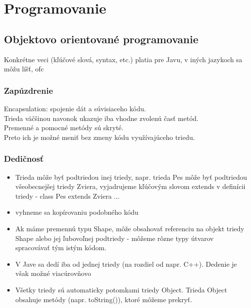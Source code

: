 \chapter[Programovanie]{Programovanie}
\label{programovanie} %


\section{Objektovo orientované programovanie}

	Konkrétne veci (kľúčové slová, syntax, etc.) platia pre Javu, v iných jazykoch sa môžu líšť, ofc
	\subsection{Zapúzdrenie}
	Encapsulation: spojenie dát a súvisiaceho kódu.\\
	Trieda väčšinou navonok ukazuje iba vhodne zvolenú časť metód.\\
	Premenné a pomocné metódy sú skryté.\\
	Preto ich je možné meniť bez zmeny kódu využívajúceho triedu.\\
	
	\subsection{Dedičnosť}
		\begin{itemize}
			\item Trieda môže byť podtriedou inej triedy, napr. trieda Pes môže byť podtriedou všeobecnejšej triedy Zviera, vyjadrujeme kľúčovým slovom extends v definícii triedy - class Pes extends Zviera { ... }
			\item vyhneme sa kopírovaniu podobného kódu
			\item Ak máme premennú typu Shape, môže obsahovať referenciu na objekt triedy Shape alebo jej ľubovoľnej podtriedy - môžeme rôzne typy útvarov spracovávať tým istým kódom.

			\item V Jave sa dedí iba od jednej triedy (na rozdiel od napr. C++). Dedenie je však možné viacúrovňovo
			
			\item Všetky triedy sú automaticky potomkami triedy Object. Trieda Object obsahuje metódy (napr. toString()), ktoré môžeme prekryť.
		\end{itemize}

